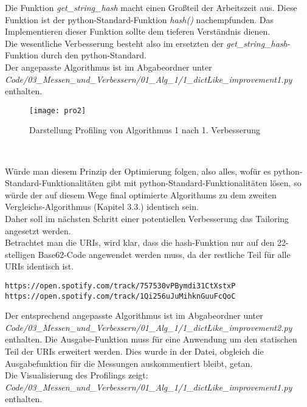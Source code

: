 \documentclass[
10pt, %
a4paper, %
oneside, %
headinclude,footinclude, %
BCOR5mm, %
]{scrartcl}
\begin{document}
Die Funktion \textit{get\_string\_hash} macht einen Großteil der Arbeitszeit aus. Diese Funktion ist der python-Standard-Funktion \textit{hash()} nachempfunden. Das Implementieren dieser Funktion sollte dem tieferen Verständnis dienen.\\
Die wesentliche Verbesserung besteht also im ersetzten der \textit{get\_string\_hash}-Funktion durch den python-Standard.\\
Der angepasste Algorithmus ist im Abgabeordner unter\\ \textit{Code/03\_Messen\_und\_Verbessern/01\_Alg\_1/1\_dictLike\_improvement1.py} enthalten.\\
\begin{figure}[h!]
	\centering 
	\texttt{[image: pro2]} 
	\caption[Darstellung Profiling Alg. 1 nach 1. Verbesserung]{Darstellung Profiling von Algorithmus 1 nach 1. Verbesserung}
\end{figure}\

Würde man diesem Prinzip der Optimierung folgen, also alles, wofür es python-Standard-Funktionalitäten gibt mit python-Standard-Funktionalitäten lösen, so würde der auf diesem Wege final optimierte Algorithums zu dem zweiten Vergleichs-Algorithmus (Kapitel 3.3.) identisch sein.\\
Daher soll im nächsten Schritt einer potentiellen Verbesserung das Tailoring angesetzt werden.\\

Betrachtet man die URIs, wird klar, dass die hash-Funktion nur auf den 22-stelligen Base62-Code angewendet werden muss, da der restliche Teil für alle URIs identisch ist.\\
\begin{lstlisting}
https://open.spotify.com/track/757530vPBymdi31CtXstxP
https://open.spotify.com/track/1Qi256uJuMihknGuuFcQoC
\end{lstlisting}

Der entsprechend angepasste Algorithmus ist im Abgabeordner unter\\ \textit{Code/03\_Messen\_und\_Verbessern/01\_Alg\_1/1\_dictLike\_improvement2.py} enthalten. Die Ausgabe-Funktion muss für eine Anwendung um den statischen Teil der URIs erweitert werden. Dies wurde in der Datei, obgleich die Ausgabefunktion für die Messungen auskommentiert bleibt, getan.\\
Die Visualisierung des Profilings zeigt:\\
\textit{Code/03\_Messen\_und\_Verbessern/01\_Alg\_1/1\_dictLike\_improvement1.py} enthalten.\\
\end{document}

